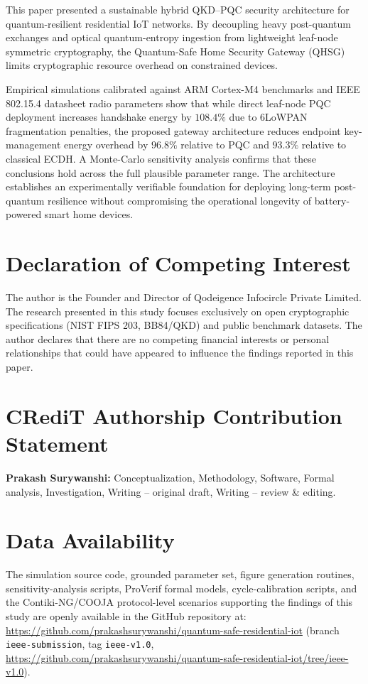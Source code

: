 \documentclass[journal]{IEEEtran}
\begin{document}
This paper presented a sustainable hybrid QKD--PQC security architecture for quantum-resilient
residential IoT networks. By decoupling heavy post-quantum exchanges and optical quantum-entropy
ingestion from lightweight leaf-node symmetric cryptography, the Quantum-Safe Home Security
Gateway (QHSG) limits cryptographic resource overhead on constrained devices.

Empirical simulations calibrated against ARM Cortex-M4 benchmarks and IEEE 802.15.4
datasheet radio parameters show that while direct leaf-node PQC deployment increases
handshake energy by $108.4\%$ due to 6LoWPAN fragmentation penalties, the proposed gateway
architecture reduces endpoint key-management energy overhead by $96.8\%$ relative to PQC
and $93.3\%$ relative to classical ECDH. A Monte-Carlo sensitivity analysis confirms that
these conclusions hold across the full plausible parameter range. The architecture
establishes an experimentally verifiable foundation for deploying long-term post-quantum
resilience without compromising the operational longevity of battery-powered smart home
devices.


\section*{Declaration of Competing Interest}
The author is the Founder and Director of Qodeigence Infocircle Private Limited.
The research presented in this study focuses exclusively on open cryptographic
specifications (NIST FIPS 203, BB84/QKD) and public benchmark datasets. The author
declares that there are no competing financial interests or personal relationships
that could have appeared to influence the findings reported in this paper.

\section*{CRediT Authorship Contribution Statement}
\textbf{Prakash Surywanshi:} Conceptualization, Methodology, Software, Formal analysis,
Investigation, Writing -- original draft, Writing -- review \& editing.

\section*{Data Availability}
The simulation source code, grounded parameter set, figure generation routines,
sensitivity-analysis scripts, ProVerif formal models, cycle-calibration scripts, and the
Contiki-NG/COOJA protocol-level scenarios supporting the findings of this study are openly
available in the GitHub repository at:
\url{https://github.com/prakashsurywanshi/quantum-safe-residential-iot}
(branch \texttt{ieee-submission}, tag \texttt{ieee-v1.0},
\url{https://github.com/prakashsurywanshi/quantum-safe-residential-iot/tree/ieee-v1.0}).
\end{document}

